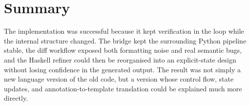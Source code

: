 \section{Summary}

The implementation was successful because it kept verification in the
loop while the internal structure changed. The bridge kept the
surrounding Python pipeline stable, the diff workflow exposed both
formatting noise and real semantic bugs, and the Haskell refiner could
then be reorganised into an explicit-state design without losing
confidence in the generated output. The result was not simply a new
language version of the old code, but a version whose control flow,
state updates, and annotation-to-template translation could be
explained much more directly.

